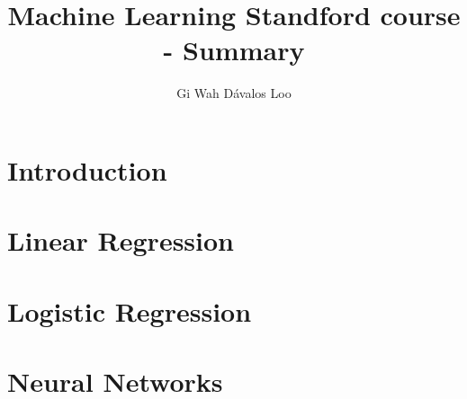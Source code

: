 \documentclass[12pt,a4paper]{article}
\title{Machine Learning Standford course - Summary}
\author{Gi Wah Dávalos Loo \textleaf}
\begin{document}
\maketitle


\section{Introduction}


\section{Linear Regression}


\section{Logistic Regression}


\section{Neural Networks}

\end{document}
